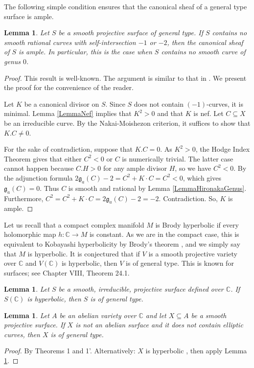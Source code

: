 \documentclass[11pt]{amsart}
\newtheorem{lemma}[theorem]{Lemma}
\theoremstyle{remark}
\numberwithin{equation}{section}
\newcommand{\gfrak}{\mathfrak{g}}
\newcommand{\C}{\mathbb{C}}
\begin{document}
The following simple condition ensures that the canonical sheaf of a general type surface is ample.

\begin{lemma}\label{LemmaGTA} Let $S$ be a smooth projective surface of general type. If $S$ contains no smooth rational curves with self-intersection $-1$ or $-2$, then the canonical sheaf of $S$ is ample.  In particular, this is the case when $S$ contains no smooth curve of genus $0$.
\end{lemma}
\begin{proof} This result is well-known. The argument is similar to that in \cite{MumfordApp}. We present the proof for the convenience of the reader.

 Let $K$ be a canonical divisor on $S$. Since $S$ does not contain $(-1)$-curves, it is minimal. Lemma \ref{LemmaNef} implies that $K^2>0$ and that $K$ is nef. Let $C\subseteq X$ be an irreducible curve. By the Nakai-Moishezon criterion, it suffices to show that $K.C\ne 0$. 

For the sake of contradiction, suppose that $K.C=0$. As $K^2>0$, the Hodge Index Theorem gives that either $C^2<0$ or $C$ is numerically trivial. The latter case cannot happen because $C.H>0$ for any ample divisor $H$, so we have $C^2<0$. By the adjunction formula $2\gfrak_a(C)-2 = C^2 +K\cdot C = C^2< 0$, which gives $\gfrak_a(C) = 0$. Thus $C$ is smooth and rational by Lemma \ref{LemmaHironakaGenus}. Furthermore, $C^2=C^2 +K\cdot C=2\gfrak_a(C)-2=-2$. Contradiction. So, $K$ is ample.
\end{proof}
Let us recall that a compact complex manifold $M$ is Brody hyperbolic if every holomorphic map $h:\C\to M$ is constant. As we are in the compact case, this is equivalent to Kobayashi hyperbolicity by Brody's theorem \cite{Brody}, and we simply say that $M$ is hyperbolic. It is conjectured that if $V$ is a smooth projective variety over $\C$ and  $V(\C)$ is hyperbolic, then $V$ is of general type. This is known for surfaces; see \cite{BHPV} Chapter VIII, Theorem 24.1.
\begin{lemma}\label{LemmaGenTypeHyp} Let $S$ be a smooth, irreducible,  projective surface defined over $\C$. If $S(\C)$ is hyperbolic, then $S$ is of general type.
\end{lemma}




\begin{lemma}\label{LemmaGenTypeTranslate} Let $A$ be an abelian variety over $\C$ and let $X\subseteq A$ be a smooth projective surface. If $X$ is not an abelian surface and it does not contain elliptic curves, then $X$ is of general type.
\end{lemma}
\begin{proof}
By \cite{Yau} Theorems 1 and 1'. Alternatively:  $X$ is hyperbolic \cite{Green}, then apply  Lemma \ref{LemmaGenTypeHyp}.
\end{proof}
\end{document}

